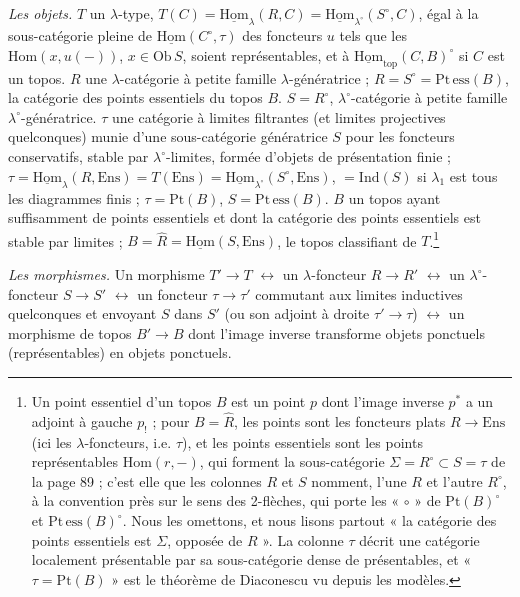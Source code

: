 \documentclass[11pt,a4paper]{article}
\begin{document}
\emph{Les objets.} $T$ un $\lambda$-type, $T(C) = \underline{\mathrm{Hom}}_{
\lambda}(R, C) = \underline{\mathrm{Hom}}_{\lambda^{\circ}}(S^{\circ}, C)$, égal
à la sous-catégorie pleine de $\underline{\mathrm{Hom}}(C^{\circ}, \tau)$ des
foncteurs $u$ tels que les $\mathrm{Hom}(x, u(-))$, $x \in \mathrm{Ob}\,S$,
soient représentables, et à $\underline{\mathrm{Hom}}_{\mathrm{top}}(C, B)^{\circ}$
si $C$ est un topos. $R$ une $\lambda$-catégorie à petite famille
$\lambda$-génératrice ; $R = S^{\circ} = \mathrm{Pt\,ess}(B)$, la catégorie
des points essentiels du topos $B$. $S = R^{\circ}$, $\lambda^{\circ}$-catégorie
à petite famille $\lambda^{\circ}$-génératrice. $\tau$ une catégorie à
limites filtrantes (et limites projectives quelconques) munie d'une
sous-catégorie génératrice $S$ pour les foncteurs conservatifs, stable par
$\lambda^{\circ}$-limites, formée d'objets de présentation finie ; $\tau =
\underline{\mathrm{Hom}}_{\lambda}(R, \mathrm{Ens}) = T(\mathrm{Ens})
= \underline{\mathrm{Hom}}_{\lambda^{\circ}}(S^{\circ}, \mathrm{Ens})$, $= \mathrm{Ind}
(S)$ si $\lambda_{1}$ est tous les diagrammes finis ; $\tau = \mathrm{Pt}
(B)$, $S = \mathrm{Pt\,ess}(B)$. $B$ un topos ayant suffisamment de points
essentiels et dont la catégorie des points essentiels est stable par
limites ; $B = \widehat{R} = \underline{\mathrm{Hom}}(S, \mathrm{Ens})$, le
topos classifiant de $T$.\footnote{Un point essentiel d'un topos $B$ est un
point $p$ dont l'image inverse $p^{*}$ a un adjoint à gauche $p_{!}$ ; pour
$B = \widehat{R}$, les points sont les foncteurs plats $R \to \mathrm{Ens}$
(ici les $\lambda$-foncteurs, i.e. $\tau$), et les points essentiels sont
les points représentables $\mathrm{Hom}(r, -)$, qui forment la
sous-catégorie $\Sigma = R^{\circ} \subset S = \tau$ de la page 89 ; c'est
elle que les colonnes $R$ et $S$ nomment, l'une $R$ et l'autre $R^{\circ}$,
à la convention près sur le sens des 2-flèches, qui porte les « $\circ$ »
de $\mathrm{Pt}(B)^{\circ}$ et $\mathrm{Pt\,ess}(B)^{\circ}$. Nous les
omettons, et nous lisons partout « la catégorie des points essentiels est
$\Sigma$, opposée de $R$ ». La colonne $\tau$ décrit une catégorie
localement présentable par sa sous-catégorie dense de présentables, et
« $\tau = \mathrm{Pt}(B)$ » est le théorème de Diaconescu vu depuis les
modèles.}

\emph{Les morphismes.} Un morphisme $T' \to T$ $\longleftrightarrow$ un
$\lambda$-foncteur $R \to R'$ $\longleftrightarrow$ un $\lambda^{\circ}$-foncteur
$S \to S'$ $\longleftrightarrow$ un foncteur $\tau \to \tau'$ commutant aux
limites inductives quelconques et envoyant $S$ dans $S'$ (ou son adjoint
à droite $\tau' \to \tau$) $\longleftrightarrow$ un morphisme de topos $B' \to
B$ dont l'image inverse transforme objets ponctuels (représentables) en
objets ponctuels.
\end{document}
